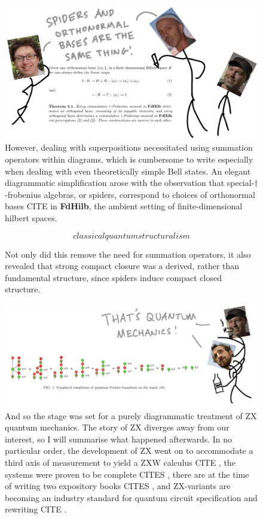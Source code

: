 \begin{figure}[h!]
\includegraphics{figures/cartoons/spiders}
\caption{However, dealing with superpositions necessitated using summation operators within diagrams, which is cumbersome to write especially when dealing with even theoretically simple Bell states. An elegant diagrammatic simplification arose with the observation that special-$\dagger$-frobenius algebras, or spiders, correspond to choices of orthonormal bases \bR CITE \e in \textbf{FdHilb}, the ambient setting of finite-dimensional hilbert spaces.}
\end{figure}

\begin{figure}[h!]
\[classicalquantumstructuralism\]
\caption{Not only did this remove the need for summation operators, it also revealed that strong compact closure was a derived, rather than fundamental structure, since spiders induce compact closed structure.}
\end{figure}

\begin{figure}[h!]
\includegraphics{figures/cartoons/ross}
\caption{And so the stage was set for a purely diagrammatic treatment of ZX quantum mechanics. The story of ZX diverges away from our interest, so I will summarise what happened afterwards. In no particular order, the development of ZX went on to accommodate a third axis of measurement to yield a ZXW calculus \bR CITE \e, the systems were proven to be complete \bR CITES \e, there are at the time of writing two expository books \bR CITES \e, and ZX-variants are becoming an industry standard for quantum circuit specification and rewriting \bR CITE \e.}
\end{figure}
\clearpage

